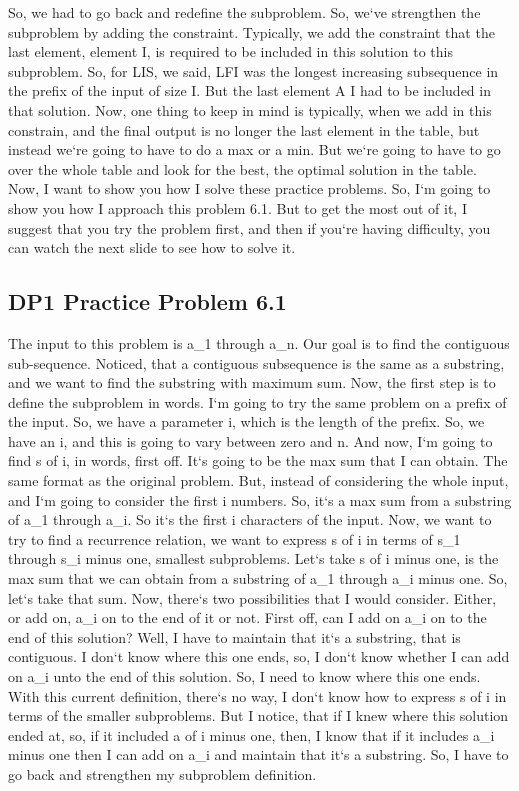 So, we had to go back and redefine the subproblem.
So, we`ve strengthen the subproblem by adding the constraint.
Typically, we add the constraint that the last element, element I, is required to be included in this solution to this subproblem.
So, for LIS, we said, LFI was the longest increasing subsequence in the prefix of the input of size I\@.
But the last element A I had to be included in that solution.
Now, one thing to keep in mind is typically, when we add in this constrain, and the final output is no longer the last element in the table, but instead we`re going to have to do a max or a min.
But we`re going to have to go over the whole table and look for the best, the optimal solution in the table.
Now, I want to show you how I solve these practice problems.
So, I`m going to show you how I approach this problem 6.1.
But to get the most out of it, I suggest that you try the problem first, and then if you`re having difficulty, you can watch the next slide to see how to solve it.

\subsection{DP1  Practice Problem 6.1}
The input to this problem is a\_1 through a\_n.
Our goal is to find the contiguous sub-sequence.
Noticed, that a contiguous subsequence is the same as a substring, and we want to find the substring with maximum sum.
Now, the first step is to define the subproblem in words.
I`m going to try the same problem on a prefix of the input.
So, we have a parameter i, which is the length of the prefix.
So, we have an i, and this is going to vary between zero and n.
And now, I`m going to find s of i, in words, first off.
It`s going to be the max sum that I can obtain.
The same format as the original problem.
But, instead of considering the whole input, and I`m going to consider the first i numbers.
So, it`s a max sum from a substring of a\_1 through a\_i.
So it`s the first i characters of the input.
Now, we want to try to find a recurrence relation, we want to express s of i in terms of s\_1 through s\_i minus one, smallest subproblems.
Let`s take s of i minus one, is the max sum that we can obtain from a substring of a\_1 through a\_i minus one.
So, let`s take that sum.
Now, there`s two possibilities that I would consider.
Either, or add on, a\_i on to the end of it or not.
First off, can I add on a\_i on to the end of this solution? Well, I have to maintain that it`s a substring, that is contiguous.
I don`t know where this one ends, so, I don`t know whether I can add on a\_i unto the end of this solution.
So, I need to know where this one ends.
With this current definition, there`s no way, I don`t know how to express s of i in terms of the smaller subproblems.
But I notice, that if I knew where this solution ended at, so, if it included a of i minus one, then, I know that if it includes a\_i minus one then I can add on a\_i and maintain that it`s a substring.
So, I have to go back and strengthen my subproblem definition.


